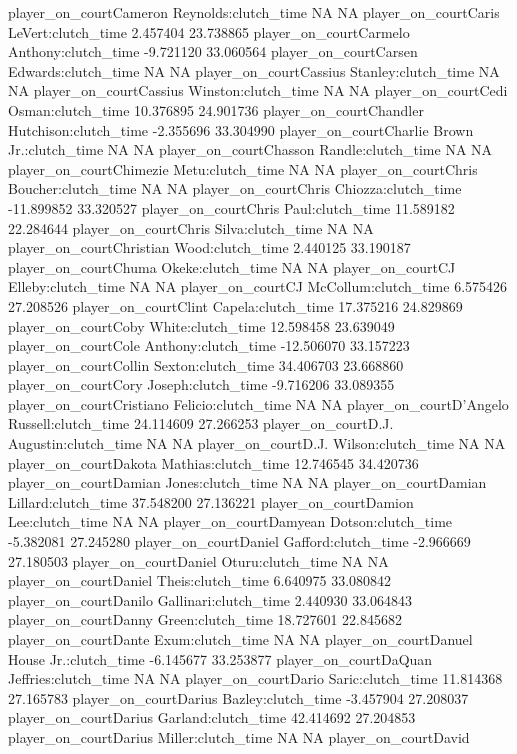 \documentclass[
  landscape]{article}
\begin{document}
player\_on\_courtCameron Reynolds:clutch\_time NA NA
player\_on\_courtCaris LeVert:clutch\_time 2.457404 23.738865
player\_on\_courtCarmelo Anthony:clutch\_time -9.721120 33.060564
player\_on\_courtCarsen Edwards:clutch\_time NA NA
player\_on\_courtCassius Stanley:clutch\_time NA NA
player\_on\_courtCassius Winston:clutch\_time NA NA
player\_on\_courtCedi Osman:clutch\_time 10.376895 24.901736
player\_on\_courtChandler Hutchison:clutch\_time -2.355696 33.304990
player\_on\_courtCharlie Brown Jr.:clutch\_time NA NA
player\_on\_courtChasson Randle:clutch\_time NA NA
player\_on\_courtChimezie Metu:clutch\_time NA NA player\_on\_courtChris
Boucher:clutch\_time NA NA player\_on\_courtChris Chiozza:clutch\_time
-11.899852 33.320527 player\_on\_courtChris Paul:clutch\_time 11.589182
22.284644 player\_on\_courtChris Silva:clutch\_time NA NA
player\_on\_courtChristian Wood:clutch\_time 2.440125 33.190187
player\_on\_courtChuma Okeke:clutch\_time NA NA player\_on\_courtCJ
Elleby:clutch\_time NA NA player\_on\_courtCJ McCollum:clutch\_time
6.575426 27.208526 player\_on\_courtClint Capela:clutch\_time 17.375216
24.829869 player\_on\_courtCoby White:clutch\_time 12.598458 23.639049
player\_on\_courtCole Anthony:clutch\_time -12.506070 33.157223
player\_on\_courtCollin Sexton:clutch\_time 34.406703 23.668860
player\_on\_courtCory Joseph:clutch\_time -9.716206 33.089355
player\_on\_courtCristiano Felicio:clutch\_time NA NA
player\_on\_courtD'Angelo Russell:clutch\_time 24.114609 27.266253
player\_on\_courtD.J. Augustin:clutch\_time NA NA player\_on\_courtD.J.
Wilson:clutch\_time NA NA player\_on\_courtDakota Mathias:clutch\_time
12.746545 34.420736 player\_on\_courtDamian Jones:clutch\_time NA NA
player\_on\_courtDamian Lillard:clutch\_time 37.548200 27.136221
player\_on\_courtDamion Lee:clutch\_time NA NA player\_on\_courtDamyean
Dotson:clutch\_time -5.382081 27.245280 player\_on\_courtDaniel
Gafford:clutch\_time -2.966669 27.180503 player\_on\_courtDaniel
Oturu:clutch\_time NA NA player\_on\_courtDaniel Theis:clutch\_time
6.640975 33.080842 player\_on\_courtDanilo Gallinari:clutch\_time
2.440930 33.064843 player\_on\_courtDanny Green:clutch\_time 18.727601
22.845682 player\_on\_courtDante Exum:clutch\_time NA NA
player\_on\_courtDanuel House Jr.:clutch\_time -6.145677 33.253877
player\_on\_courtDaQuan Jeffries:clutch\_time NA NA
player\_on\_courtDario Saric:clutch\_time 11.814368 27.165783
player\_on\_courtDarius Bazley:clutch\_time -3.457904 27.208037
player\_on\_courtDarius Garland:clutch\_time 42.414692 27.204853
player\_on\_courtDarius Miller:clutch\_time NA NA player\_on\_courtDavid
\end{document}
